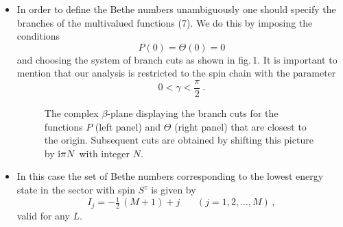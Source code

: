 \documentclass[12pt]{article}
\def\be{\begin{equation}}
\def\ee{\end{equation}}
\def\be{\begin{equation}}
\def\ee{\end{equation}}
\def\ri{{\rm i}}
\begin{document}
\begin{itemize}
\item
In order to define the Bethe numbers unambiguously one should specify the branches of the multivalued
functions (7). We do this by imposing the conditions 
$$
P(0)=\Theta(0)=0
$$
and choosing the system of branch cuts as shown in fig.\,1. It is important to mention that our analysis is restricted to the spin chain 
with the parameter 
\be
0<\gamma<\frac{\pi}{2}\ .
\ee
\begin{figure}
\centering
\begin{subfigure}[b]{0.45\textwidth}
\end{subfigure}
\begin{subfigure}[b]{0.45\textwidth}
\end{subfigure}
\caption{\small
The complex $\beta$-plane displaying the branch cuts for the functions
$P$  (left panel) and $\Theta$ (right panel) that are closest to the origin.
Subsequent cuts are obtained by shifting this picture by $\ri\pi N$ with integer $N$.
\label{branch1}}
\end{figure}

\item
In this case the set of Bethe numbers corresponding to the lowest energy state in the sector with spin $S^z$ is given by
\be
I_j=-\tfrac{1}{2}\,(M+1)+j\ \ \ \ \ \ \ \ (j=1,2,\ldots, M)\,,
\ee
valid for any $L$. 


\end{itemize}
\end{document}
